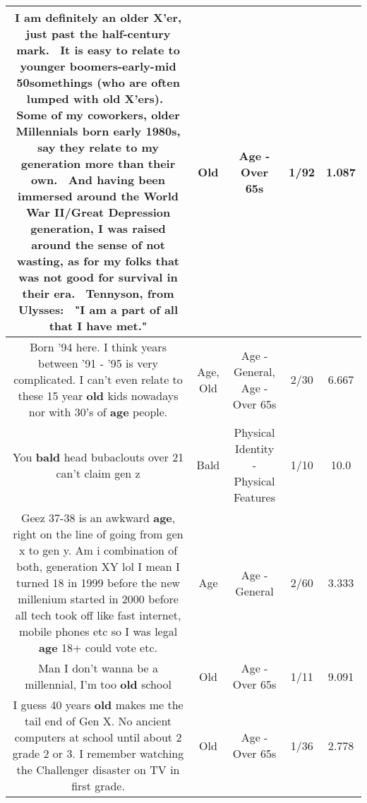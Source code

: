 \documentclass[11pt]{article}
\newlength\mylength
\begin{document}
\begin{center}
\begin{longtable}{|C{.65\mylength}|C{.30\mylength}|C{.12\mylength}|C{.12\mylength}|C{.12\mylength}|}
  \small I am definitely an older X'er, just past the half-century mark.  It is easy to relate to younger boomers-early-mid 50somethings (who are often lumped with \textbf{old} X'ers).  Some of my coworkers, older Millennials born early 1980s, say they relate to my generation more than their own.  And having been immersed around the World War II/Great Depression generation, I was raised around the sense of not wasting, as for my folks that was not good for survival in their era.  Tennyson, from Ulysses:  "I am a part of all that I have met."\normalsize   & Old & Age - Over 65s & 1/92 & 1.087 \\  \hline
  \small Born '94 here. I think years between '91 - '95 is very complicated. I can't even relate to these 15 year \textbf{old} kids nowadays nor with 30's of \textbf{age} people.\normalsize   & Age, Old & Age - General, Age - Over 65s & 2/30 & 6.667 \\  \hline
  \small You \textbf{bald} head bubaclouts over 21 can't claim gen z\normalsize   & Bald & Physical Identity - Physical Features & 1/10 & 10.0 \\  \hline
  \small Geez 37-38 is an awkward \textbf{age}, right on the line of going from gen x to gen y. Am i combination of both, generation XY lol I mean I turned 18 in 1999 before the new millenium started in 2000 before all tech took off like fast internet, mobile phones etc so I was legal \textbf{age} 18+ could vote etc.\normalsize   & Age & Age - General & 2/60 & 3.333 \\  \hline
  \small Man I don't wanna be a millennial, I'm too \textbf{old} school\normalsize   & Old & Age - Over 65s & 1/11 & 9.091 \\  \hline
  \small I guess 40 years \textbf{old} makes me the tail end of Gen X. No ancient computers at school until about 2 grade 2 or 3. I remember watching the Challenger disaster on TV in  first grade.\normalsize   & Old & Age - Over 65s & 1/36 & 2.778 \\  \hline

\end{longtable}
\end{center}
\end{document}

